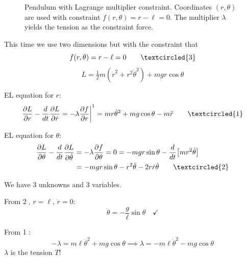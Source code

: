 \begin{figure}[H]
\begin{center}
\end{center}
\caption{Pendulum with Lagrange multiplier constraint. Coordinates $(r,\theta)$ are used with constraint $f(r,\theta) = r-\ell = 0$. The multiplier $\lambda$ yields the tension as the constraint force.}
\label{fig:constrained_pendulum}
\end{figure}

This time we use two dimensions but with the constraint that
\[
    f(r, \theta) = r - \ell = 0 \qquad \textcircled{\small 3}
\]
\[
    L = \tfrac{1}{2}m(\dot{r}^2 + r^2 \dot{\theta}^2) + mgr\cos\theta
\]

EL equation for $r$:
\[
    \frac{\partial L}{\partial r} - \frac{d}{dt}\frac{\partial L}{\partial \dot{r}} = -\lambda \frac{\partial f}{\partial r}\bigg|^{1} = mr\dot{\theta}^2 + mg\cos\theta - m\ddot{r} \qquad \textcircled{\small 1}
\]

EL equation for $\theta$:
\begin{align*}
    \frac{\partial L}{\partial \theta} - \frac{d}{dt}\frac{\partial L}{\partial \dot{\theta}} &= -\lambda \frac{\partial f}{\partial \theta} = 0 = -mgr\sin\theta - \frac{d}{dt}\!\left[mr^2\dot{\theta}\right] \\
    &= -mgr\sin\theta - r^2\ddot{\theta} - 2r\dot{r}\dot{\theta} \qquad \textcircled{\small 2}
\end{align*}

We have 3 unknowns and 3 variables.

From \textcircled{\small 2}, $r = \ell$, $\dot{r} = 0$:
\[
    \ddot{\theta} = -\frac{g}{\ell}\sin\theta \quad \checkmark
\]

From \textcircled{\small 1}:
\[
    -\lambda = m\ell\dot{\theta}^2 + mg\cos\theta \implies \lambda = -m\ell\dot{\theta}^2 - mg\cos\theta
\]
$\lambda$ is the tension $T$!

